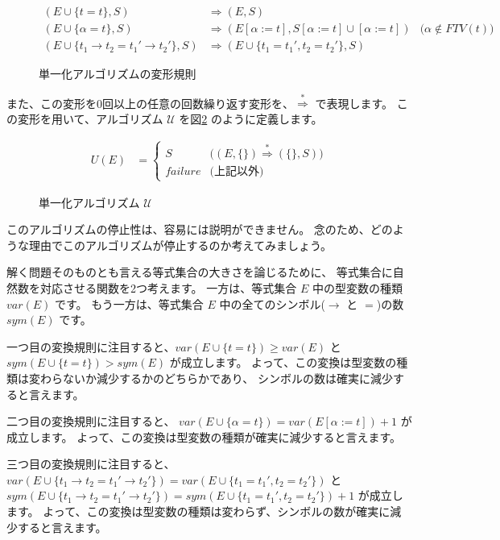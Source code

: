 \begin{figure}[htbp]
  \begin{align*}
    (E \cup \{t = t\}, S)
      &\Longrightarrow (E, S) \\
    (E \cup \{\alpha = t\}, S)
      &\Longrightarrow (E[\alpha := t], S[\alpha := t] \cup [\alpha := t])
      &\text{($\alpha \notin \mathit{FTV(t)}$)}\\
    (E \cup \{t_1 \to t_2 = t_1' \to t_2'\}, S)
      &\Longrightarrow (E \cup \{t_1 = t_1', t_2 = t_2'\}, S)
  \end{align*}
  \caption{単一化アルゴリズムの変形規則}
  \label{fig:unification-trans}
\end{figure}

また、この変形を0回以上の任意の回数繰り返す変形を、$\stackrel{*}{\Longrightarrow}$ で表現します。
この変形を用いて、アルゴリズム $\mathcal U$ を図\ref{fig:algorithm-u} のように定義します。

\begin{figure}[htbp]
  \begin{align*}
    U(E) &=
    \begin{cases}
      S & \text{($(E, \{\}) \stackrel{*}{\Longrightarrow} (\{\}, S)$)} \\
      \mathit{failure} & \text{(上記以外)}
    \end{cases}
  \end{align*}
  \caption{単一化アルゴリズム $\mathcal U$}
  \label{fig:algorithm-u}
\end{figure}

このアルゴリズムの停止性は、容易には説明ができません。
念のため、どのような理由でこのアルゴリズムが停止するのか考えてみましょう。

解く問題そのものとも言える等式集合の大きさを論じるために、
等式集合に自然数を対応させる関数を2つ考えます。
一方は、等式集合 $E$ 中の型変数の種類 $\mathit{var}(E)$ です。
もう一方は、等式集合 $E$ 中の全てのシンボル($\to$ と $=$)の数 $\mathit{sym}(E)$ です。

一つ目の変換規則に注目すると、$\mathit{var}(E \cup \{t = t\}) \ge \mathit{var}(E)$ と
$\mathit{sym}(E \cup \{t = t\}) > \mathit{sym}(E)$ が成立します。
よって、この変換は型変数の種類は変わらないか減少するかのどちらかであり、
シンボルの数は確実に減少すると言えます。

二つ目の変換規則に注目すると、
$\mathit{var}(E \cup \{\alpha = t\}) = \mathit{var}(E[\alpha := t])+1$ が成立します。
よって、この変換は型変数の種類が確実に減少すると言えます。

三つ目の変換規則に注目すると、
$\mathit{var}(E \cup \{t_1 \to t_2 = t_1' \to t_2'\}) =
 \mathit{var}(E \cup \{t_1 = t_1', t_2 = t_2'\})$
と
$\mathit{sym}(E \cup \{t_1 \to t_2 = t_1' \to t_2'\}) =
 \mathit{sym}(E \cup \{t_1 = t_1', t_2 = t_2'\})+1$
が成立します。
よって、この変換は型変数の種類は変わらず、シンボルの数が確実に減少すると言えます。

